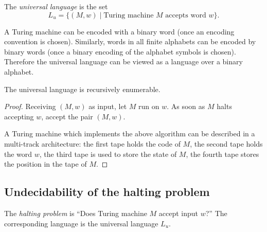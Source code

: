 \begin{page}

\begin{dfn}
The \emph{universal language} is the set
\[
L_u = \{(M,w) \mid \text{Turing machine }M \text{ accepts word }w\}.
\]
\end{dfn}

\end{page}

\begin{page}

A Turing machine can be encoded with a binary word (once an encoding convention is chosen).
Similarly, words in all finite alphabets can be encoded by binary words (once a binary encoding of the alphabet symbols is chosen).
Therefore the universal language can be viewed as a language over a binary alphabet.


\end{page}

\begin{page}

\begin{lem}
\label{lem:UniLangRE}
The universal language is recursively enumerable.
\end{lem}

\end{page}

\begin{page}

\begin{proof}
Receiving $(M, w)$ as input, let $M$ run on $w$.
As soon as $M$ halts accepting $w$, accept the pair $(M,w)$.

A Turing machine which implements the above algorithm can be described in a multi-track architecture:
the first tape holds the code of $M$, the second tape holds the word $w$, the third tape is used to store the state of $M$,
the fourth tape stores the position in the tape of $M$.
\end{proof}





\end{page}

\begin{page}

\subsection{Undecidability of the halting problem}
The \emph{halting problem} is ``Does Turing machine $M$ accept input $w$?''
The corresponding language is the universal language $L_u$.


\end{page}

